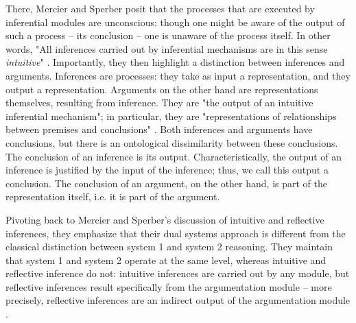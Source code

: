 There, Mercier and Sperber posit that the processes that are executed by inferential modules are unconscious: though one might be aware of the output of such a process -- its conclusion -- one is unaware of the process itself. In other words, "All inferences carried out by inferential mechanisms are in this sense \emph{intuitive}" \citep[p.~58]{MS11}.
Importantly, they then highlight a distinction between inferences and arguments.
Inferences are processes: they take as input a representation, and they output a representation.
Arguments on the other hand are representations themselves, resulting from inference. They are "the output of an intuitive inferential mechanism"; in particular, they are "representations of relationships between premises and conclusions" \citep[p.~58]{MS11}.
Both inferences and arguments have conclusions, but there is an ontological dissimilarity between these conclusions.
The conclusion of an inference is its output. Characteristically, the output of an inference is justified by the input of the inference; thus, we call this output a conclusion.
The conclusion of an argument, on the other hand, is part of the representation itself, i.e. it is part of the argument.

Pivoting back to Mercier and Sperber's \citeyear{MS09} discussion of intuitive and reflective inferences, they emphasize that their dual systems approach is different from the classical distinction between system 1 and system 2 reasoning. They maintain that system 1 and system 2 operate at the same level, whereas intuitive and reflective inference do not: intuitive inferences are carried out by any module, but reflective inferences result specifically from the argumentation module -- more precisely, reflective inferences are an indirect output of the argumentation module \citep[p.~156]{MS09}.

